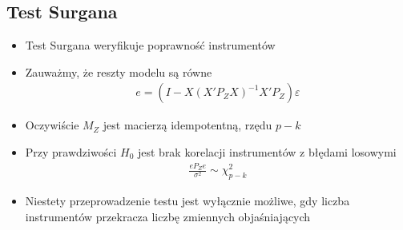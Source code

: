 \subsection{Test Surgana}
\begin{itemize}
	\item Test Surgana weryfikuje poprawność instrumentów
	\item Zauważmy, że reszty modelu są równe
	\begin{gather*}
	e=\left(I-X\left(X'P_ZX\right)^{-1}X'P_Z\right)\varepsilon
	\end{gather*}
	\item Oczywiście $ M_Z $ jest macierzą idempotentną, rzędu $ p-k $
	\item Przy prawdziwości $ H_0 $ jest brak korelacji instrumentów z błędami losowymi
	\begin{gather*}
	\frac{eP_Ze}{\sigma^2}\sim \chi^2_{p-k}
\end{gather*}
\item Niestety przeprowadzenie testu jest wyłącznie możliwe, gdy liczba instrumentów przekracza liczbę zmiennych objaśniających
\end{itemize}
